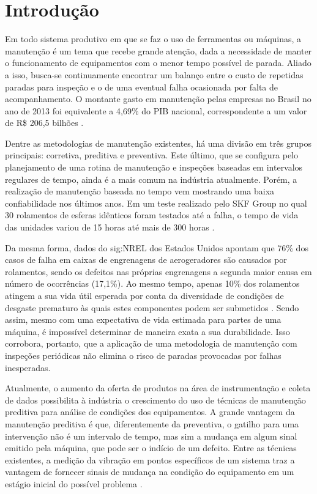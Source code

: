 \documentclass[12pt,oneside,english,brazil,lmodern,siglas,simbolos,cite=num]{ucsmonograph}
\begin{document}
	\listoftodos
	
	\textual %
	
	\chapter{Introdução}
	Em todo sistema produtivo em que se faz o uso de ferramentas ou máquinas, a manutenção é um tema que recebe grande atenção, dada a necessidade de manter o funcionamento de equipamentos com o menor tempo possível de parada.
	Aliado a isso, busca-se continuamente encontrar um balanço entre o custo de repetidas paradas para inspeção e o de uma eventual falha ocasionada por falta de acompanhamento.
	O montante gasto em manutenção pelas empresas no Brasil no ano de 2013 foi equivalente a 4,69\% do PIB nacional, correspondente a um valor de R\$ 206,5 bilhões \cite{seleme:2015}.
	
	Dentre as metodologias de manutenção existentes, há uma divisão em três grupos principais: corretiva, preditiva e preventiva.
	Este último, que se configura pelo planejamento de uma rotina de manutenção e inspeções baseadas em intervalos regulares de tempo, ainda é a mais comum na indústria atualmente.
	Porém, a realização de manutenção baseada no tempo vem mostrando uma baixa confiabilidade nos últimos anos.
	Em um teste realizado pelo SKF Group no qual 30 rolamentos de esferas idênticos foram testados até a falha, o tempo de vida das unidades variou de 15 horas até mais de 300 horas \cite{hashemian:2011}.
	 
	Da mesma forma, dados do \gls{sig:NREL} dos Estados Unidos apontam que 76\% dos casos de falha em caixas de engrenagens de aerogeradores são causados por rolamentos, sendo os defeitos nas próprias engrenagens a segunda maior causa em número de ocorrências (17,1\%).
	Ao mesmo tempo, apenas 10\% dos rolamentos atingem a sua vida útil esperada por conta da diversidade de condições de desgaste prematuro às quais estes componentes podem ser submetidos \cite{peeters:2018}.
	Sendo assim, mesmo com uma expectativa de vida estimada para partes de uma máquina, é impossível determinar de maneira exata a sua durabilidade.
	Isso corrobora, portanto, que a aplicação de uma metodologia de manutenção com inspeções periódicas não elimina o risco de paradas provocadas por falhas inesperadas.
	
	Atualmente, o aumento da oferta de produtos na área de instrumentação e coleta de dados possibilita à indústria o crescimento do uso de técnicas de manutenção preditiva para análise de condições dos equipamentos.
	A grande vantagem da manutenção preditiva é que, diferentemente da preventiva, o gatilho para uma intervenção não é um intervalo de tempo, mas sim a mudança em algum sinal emitido pela máquina, que pode ser o indício de um defeito.
	Entre as técnicas existentes, a medição da vibração em pontos específicos de um sistema traz a vantagem de fornecer sinais de mudança na condição do equipamento em um estágio inicial do possível problema \cite{al-najjar:2004}.
	
\end{document}
